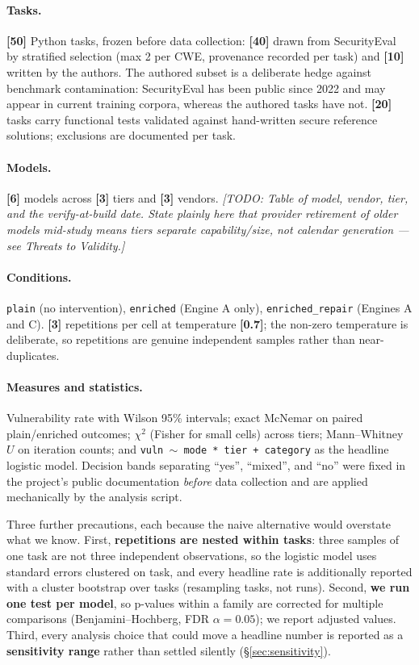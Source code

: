 \documentclass[10pt,conference]{article}
\newcommand{\PLACEHOLDER}[1]{{\color{placeholderred}\textbf{[#1]}}}
\newcommand{\TODO}[1]{{\color{placeholderred}\textit{[TODO: #1]}}}
\begin{document}
\paragraph{Tasks.} \PLACEHOLDER{50} Python tasks, frozen before data collection:
\PLACEHOLDER{40} drawn from SecurityEval~\cite{siddiq2022securityeval} by
stratified selection (max 2 per CWE, provenance recorded per task) and
\PLACEHOLDER{10} written by the authors. The authored subset is a deliberate
hedge against benchmark contamination: SecurityEval has been public since 2022
and may appear in current training corpora, whereas the authored tasks have
not. \PLACEHOLDER{20} tasks carry functional tests validated against
hand-written secure reference solutions; exclusions are documented per task.

\paragraph{Models.} \PLACEHOLDER{6} models across \PLACEHOLDER{3} tiers and
\PLACEHOLDER{3} vendors. \TODO{Table of model, vendor, tier, and the
verify-at-build date. State plainly here that provider retirement of older
models mid-study means tiers separate capability/size, not calendar generation
--- see Threats to Validity.}

\paragraph{Conditions.} \texttt{plain} (no intervention), \texttt{enriched}
(Engine A only), \texttt{enriched\_repair} (Engines A and C).
\PLACEHOLDER{3} repetitions per cell at temperature \PLACEHOLDER{0.7}; the
non-zero temperature is deliberate, so repetitions are genuine independent
samples rather than near-duplicates.

\paragraph{Measures and statistics.} Vulnerability rate with Wilson 95\%
intervals; exact McNemar on paired plain/enriched outcomes; $\chi^2$ (Fisher for
small cells) across tiers; Mann--Whitney $U$ on iteration counts; and
\texttt{vuln $\sim$ mode * tier + category} as the headline logistic model.
Decision bands separating ``yes'', ``mixed'', and ``no'' were fixed in the
project's public documentation \emph{before} data collection and are applied
mechanically by the analysis script.

Three further precautions, each because the naive alternative would overstate
what we know. First, \textbf{repetitions are nested within tasks}: three samples
of one task are not three independent observations, so the logistic model uses
standard errors clustered on task, and every headline rate is additionally
reported with a cluster bootstrap over tasks (resampling tasks, not runs).
Second, \textbf{we run one test per model}, so p-values within a family are
corrected for multiple comparisons (Benjamini--Hochberg, FDR $\alpha = 0.05$); we
report adjusted values. Third, every analysis choice that could move a headline
number is reported as a \textbf{sensitivity range} rather than settled silently
(\S\ref{sec:sensitivity}).
\end{document}
